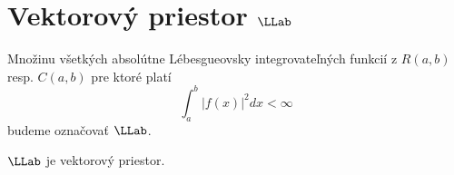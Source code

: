 

\section{Vektorový priestor $\LLab$}
\begin{definicia}
    Množinu všetkých absolútne Lébesgueovsky integrovateľných 
    funkcií z $R(a,b)$ resp. $C(a,b)$ pre ktoré platí
    \begin{equation*}
        \int_a^b |f(x)|^2 dx < \infty
    \end{equation*}
    budeme označovať $\LLab$.
\end{definicia}

\begin{lema}
    $\LLab$ je vektorový priestor.
    \label{lema:LLab_je_vp}
\end{lema}

